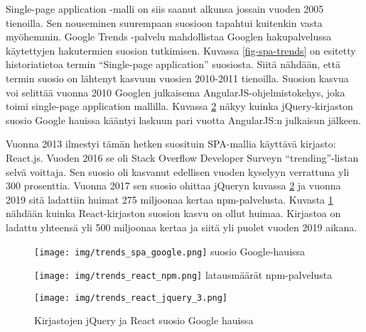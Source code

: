 \documentclass[finnish,twoside,censored,csm,sw-track-2018]{HYthesisML}
\begin{document}
Single-page application -malli on siis saanut alkunsa jossain vuoden 2005 tienoilla. Sen nouseminen suurempaan suosioon tapahtui kuitenkin vasta myöhemmin. Google Trends -palvelu mahdollistaa Googlen hakupalvelussa käytettyjen hakutermien suosion tutkimisen. Kuvassa \ref{fig-spa-trends} on esitetty historiatietoa termin ``Single-page application'' suosiosta. Siitä nähdään, että termin suosio on lähtenyt kasvuun vuosien 2010-2011 tienoilla. Suosion kasvua voi selittää vuonna 2010 Googlen julkaisema \citep{angularJS-release} AngularJS-ohjelmistokehys, joka toimi single-page application mallilla. Kuvassa \ref{fig-react-vs-jquery} näkyy kuinka jQuery-kirjaston suosio Google hauissa kääntyi laskuun pari vuotta AngularJS:n julkaisun jälkeen.

Vuonna 2013 ilmestyi tämän hetken suosituin SPA-mallia käyttävä kirjasto: React.js. Vuoden 2016 se oli Stack Overflow Developer Surveyn \citep{SO-survey-2016} ``trending''-listan selvä voittaja. Sen suosio oli kasvanut edellisen vuoden kyselyyn verrattuna yli 300 prosenttia. Vuonna 2017 sen suosio ohittaa jQueryn kuvassa \ref{fig-react-vs-jquery} ja vuonna 2019 sitä ladattiin huimat 275 miljoonaa kertaa npm-palvelusta. Kuvasta \ref{fig-react-npm} nähdään kuinka React-kirjaston suosion kasvu on ollut huimaa. Kirjastoa on ladattu yhteensä yli 500 miljoonaa kertaa ja siitä yli puolet vuoden 2019 aikana.

\begin{figure}
\centering
\begin{minipage}{0.5\textwidth}
    \centering
    \texttt{[image: img/trends\_spa\_google.png]}
    \footnotesize suosio Google-hauissa
    \label{fig-spa-trends}
\end{minipage}%
\begin{minipage}{0.5\textwidth}
  \centering
  \texttt{[image: img/trends\_react\_npm.png]}
  \footnotesize latausmäärät npm-palvelusta
  \label{fig-react-npm}
\end{minipage}
\end{figure}

\begin{figure}[ht]
  \centering
    \texttt{[image: img/trends\_react\_jquery\_3.png]}
  \caption{Kirjastojen jQuery ja React suosio Google hauissa}
  \label{fig-react-vs-jquery}
\end{figure}

\clearpage
\end{document}
